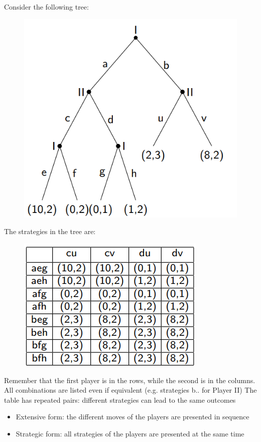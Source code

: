 \begin{example}
    Consider the following tree: 
    \begin{figure}[H]
        \centering
        \includegraphics[width=0.75\linewidth]{images/tree2.png}
    \end{figure}
    The strategies in the tree are: 
    \begin{figure}[H]
        \centering
        \includegraphics[width=0.75\linewidth]{images/strategies.png}
    \end{figure}
    Remember that the first player is in the rows, while the second is in the columns. 
    All combinations are listed even if equivalent (e.g. strategies b.. for Player II)
    The table has repeated pairs: different strategies can lead to the same outcomes
    \begin{itemize}
        \item Extensive form: the different moves of the players are presented in sequence
        \item Strategic form: all strategies of the players are presented at the same time
    \end{itemize}
\end{example}


